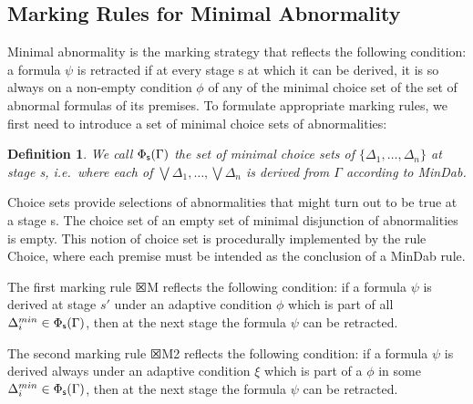 \documentclass[]{article}
\newtheorem{definition}{Definition}
\begin{document}
\subsection{Marking Rules for Minimal Abnormality}
%
%
Minimal abnormality is the marking strategy that reflects the following condition: a formula $\psi$ is retracted if at every stage {\sf s} at which it can be derived, it is so always on a non-empty condition $\phi$ of any of the minimal choice set of the set of abnormal formulas of its premises. To formulate appropriate marking rules, we first need to introduce a set of minimal choice sets of abnormalities:
%
\begin{definition}
We call $\Phi_{{\sf s}}(\Gamma)$ the set of minimal choice sets of $\{\Delta_{1}, \dots, \Delta_{n}\}$ at stage {\sf s}, i.e.\ where each of $\bigvee\Delta_{1}, \dots, \bigvee\Delta_{n}$ is derived from $\Gamma$ according to {\sf MinDab}.
\end{definition}
Choice sets provide selections of abnormalities that might turn out to be true at a stage {\sf s}. The choice set of an empty set of minimal disjunction of abnormalities is empty. This notion of choice set is procedurally implemented by the rule {\sf Choice}, where each premise must be intended as the conclusion of a {\sf MinDab} rule.

The first marking rule $\XBox$M reflects the following condition: if a formula $\psi$ is derived at stage $s'$ under an adaptive condition $\phi$ which is part of all $\Delta_{i}^{min} \in \Phi_{\sf s}(\Gamma)$, then at the next stage the formula $\psi$ can be retracted.

The second marking rule $\XBox$M2 reflects the following condition: if a formula $\psi$ is derived always under an adaptive condition $\xi$ which is part of a $\phi$ in some $\Delta_{i}^{min} \in \Phi_{\sf s}(\Gamma)$, then at the next stage the formula $\psi$ can be retracted.
\end{document}
